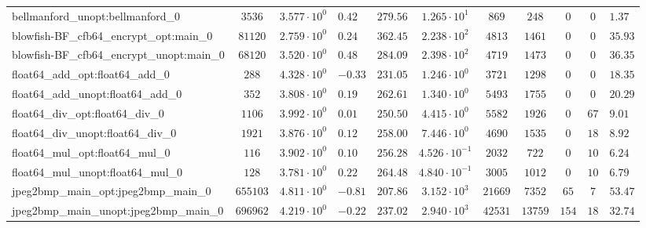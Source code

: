 \begin{tabular}{|l|c|HHc|c|c|c|c|cH|}
bellmanford\_unopt:bellmanford\_0               & $ 3536     $ & $ 3.577 \cdot 10^{0} $ & $ 0.42  $ & $ 279.56 $ & $ 1.265 \cdot 10^{1}  $ & $ 869    $ & $ 248   $ & $ 0   $ & $ 0   $ & $ 1.37    $ \\
blowfish-BF\_cfb64\_encrypt\_opt:main\_0        & $ 81120    $ & $ 2.759 \cdot 10^{0} $ & $ 0.24  $ & $ 362.45 $ & $ 2.238 \cdot 10^{2}  $ & $ 4813   $ & $ 1461  $ & $ 0   $ & $ 0   $ & $ 35.93   $ \\
blowfish-BF\_cfb64\_encrypt\_unopt:main\_0      & $ 68120    $ & $ 3.520 \cdot 10^{0} $ & $ 0.48  $ & $ 284.09 $ & $ 2.398 \cdot 10^{2}  $ & $ 4719   $ & $ 1473  $ & $ 0   $ & $ 0   $ & $ 36.35   $ \\
float64\_add\_opt:float64\_add\_0               & $ 288      $ & $ 4.328 \cdot 10^{0} $ & $ -0.33 $ & $ 231.05 $ & $ 1.246 \cdot 10^{0}  $ & $ 3721   $ & $ 1298  $ & $ 0   $ & $ 0   $ & $ 18.35   $ \\
float64\_add\_unopt:float64\_add\_0             & $ 352      $ & $ 3.808 \cdot 10^{0} $ & $ 0.19  $ & $ 262.61 $ & $ 1.340 \cdot 10^{0}  $ & $ 5493   $ & $ 1755  $ & $ 0   $ & $ 0   $ & $ 20.29   $ \\
float64\_div\_opt:float64\_div\_0               & $ 1106     $ & $ 3.992 \cdot 10^{0} $ & $ 0.01  $ & $ 250.50 $ & $ 4.415 \cdot 10^{0}  $ & $ 5582   $ & $ 1926  $ & $ 0   $ & $ 67  $ & $ 9.01    $ \\
float64\_div\_unopt:float64\_div\_0             & $ 1921     $ & $ 3.876 \cdot 10^{0} $ & $ 0.12  $ & $ 258.00 $ & $ 7.446 \cdot 10^{0}  $ & $ 4690   $ & $ 1535  $ & $ 0   $ & $ 18  $ & $ 8.92    $ \\
float64\_mul\_opt:float64\_mul\_0               & $ 116      $ & $ 3.902 \cdot 10^{0} $ & $ 0.10  $ & $ 256.28 $ & $ 4.526 \cdot 10^{-1} $ & $ 2032   $ & $ 722   $ & $ 0   $ & $ 10  $ & $ 6.24    $ \\
float64\_mul\_unopt:float64\_mul\_0             & $ 128      $ & $ 3.781 \cdot 10^{0} $ & $ 0.22  $ & $ 264.48 $ & $ 4.840 \cdot 10^{-1} $ & $ 3005   $ & $ 1012  $ & $ 0   $ & $ 10  $ & $ 6.79    $ \\
jpeg2bmp\_main\_opt:jpeg2bmp\_main\_0           & $ 655103   $ & $ 4.811 \cdot 10^{0} $ & $ -0.81 $ & $ 207.86 $ & $ 3.152 \cdot 10^{3}  $ & $ 21669  $ & $ 7352  $ & $ 65  $ & $ 7   $ & $ 53.47   $ \\
jpeg2bmp\_main\_unopt:jpeg2bmp\_main\_0         & $ 696962   $ & $ 4.219 \cdot 10^{0} $ & $ -0.22 $ & $ 237.02 $ & $ 2.940 \cdot 10^{3}  $ & $ 42531  $ & $ 13759 $ & $ 154 $ & $ 18  $ & $ 32.74   $ \\

\end{tabular}
